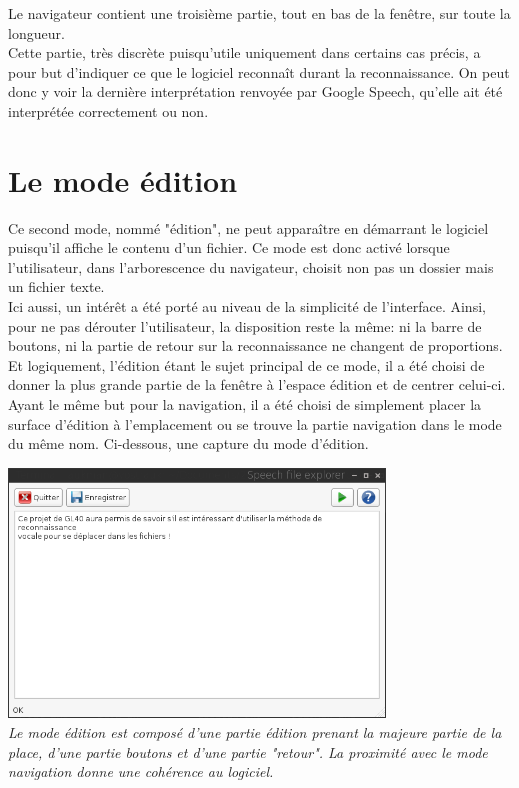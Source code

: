 \documentclass[a4paper, 11pt]{report}
\begin{document}
	Le navigateur contient une troisième partie, tout en bas de la fenêtre, sur toute la longueur.\\
	Cette partie, très discrète puisqu'utile uniquement dans certains cas précis, a pour but d'indiquer ce que le logiciel reconnaît durant la reconnaissance.	On peut donc y voir la dernière interprétation renvoyée par Google Speech, qu'elle ait été interprétée correctement ou non.
	
	\section{Le mode édition}
	
	Ce second mode, nommé "édition", ne peut apparaître en démarrant le logiciel puisqu'il affiche le contenu d'un fichier. Ce mode est donc activé lorsque l'utilisateur, dans l'arborescence du navigateur, choisit non pas un dossier mais un fichier texte.\\
	Ici aussi, un intérêt a été porté au niveau de la simplicité de l'interface. Ainsi, pour ne pas dérouter l'utilisateur, la disposition reste la même: ni la barre de boutons, ni la partie de retour sur la reconnaissance ne changent de proportions. Et logiquement, l'édition étant le sujet principal de ce mode, il a été choisi de donner la plus grande partie de la fenêtre à l'espace édition et de centrer celui-ci. Ayant le même but pour la navigation, il a été choisi de simplement placer la surface d'édition à l'emplacement ou se trouve la partie navigation dans le mode du même nom. Ci-dessous, une capture du mode d'édition.\\
	
	\begin{center}
		\includegraphics[width=10cm]{editor}\\
		\emph{Le mode édition est composé d'une partie édition prenant la majeure partie de la place, d'une partie boutons et d'une partie "retour". La proximité avec le mode navigation donne une cohérence au logiciel.\\}
	\end{center}
	
\end{document}
